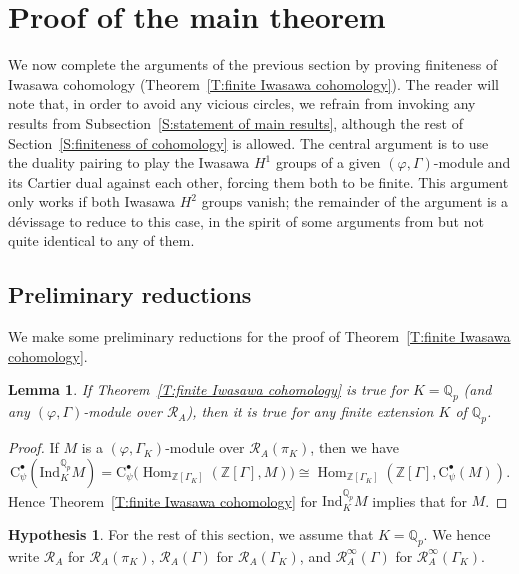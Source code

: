 \documentclass[12pt]{article}
\newtheorem{lemma}[theorem]{Lemma}
\theoremstyle{definition}
\newtheorem{hypothesis}[theorem]{Hypothesis}
\numberwithin{equation}{theorem}
\newcommand{\calR}{\mathcal{R}}
\newcommand{\QQ}{\mathbb{Q}}
\newcommand{\ZZ}{\mathbb{Z}}
\newcommand{\rmC}{\mathrm{C}}
\newcommand{\Ind}{\mathrm{Ind}}
\def\Qp{\QQ_p}
\DeclareMathOperator{\Hom}{Hom}
\begin{document}
\section{Proof of the main theorem}
\label{S:proof}

We now complete the arguments of the previous section by proving
finiteness of Iwasawa cohomology (Theorem~\ref{T:finite Iwasawa
  cohomology}).  The reader will note that, in order to avoid any
vicious circles, we refrain from invoking any results from
Subsection~\ref{S:statement of main results}, although the rest of
Section~\ref{S:finiteness of cohomology} is allowed. The central
argument is to use the duality pairing to play the Iwasawa $H^1$
groups of a given $(\varphi, \Gamma)$-module and its Cartier dual
against each other, forcing them both to be finite. This argument only
works if both Iwasawa $H^2$ groups vanish; the remainder of the
argument is a d\'evissage to reduce to this case, in the spirit of
some arguments from \cite{liu} but not quite identical to any of them.

\subsection{Preliminary reductions}

We make some preliminary reductions for the proof of Theorem~\ref{T:finite Iwasawa cohomology}.

\begin{lemma}
\label{L:theorem for K=>for Qp}
If Theorem~\ref{T:finite Iwasawa cohomology} is true for $K = \Qp$ (and any $(\varphi, \Gamma)$-module over $\calR_A$), then it is true for any finite extension $K$ of $\Qp$.
\end{lemma}
\begin{proof}
If $M$ is a $(\varphi, \Gamma_K)$-module over $\calR_A(\pi_K)$, then we have
\[
\rmC^\bullet_\psi(\Ind_K^{\Qp}M) = \rmC^\bullet_\psi\big(\Hom_{\ZZ[\Gamma_K]}(\ZZ[\Gamma], M)\big) \cong \Hom_{\ZZ[\Gamma_K]}(\ZZ[\Gamma], \rmC^\bullet_\psi(M)).
\]
Hence Theorem~\ref{T:finite Iwasawa cohomology} for $\Ind_K^{\Qp}M$ implies that for $M$.
\end{proof}

\begin{hypothesis}
\label{H:K=Qp}
For the rest of this section, we assume that $K = \Qp$.  We hence write $\calR_A$ for $\calR_A(\pi_K)$, $\calR_A(\Gamma)$ for $\calR_A(\Gamma_K)$, and $\calR_A^\infty(\Gamma)$ for $\calR_A^\infty(\Gamma_K)$.
\end{hypothesis}
\end{document}
